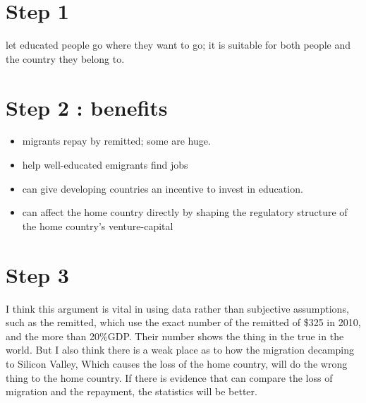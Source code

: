 \documentclass{thuemp}
\begin{document}






\maketitle




\wuhao 

\section*{Step 1}
let educated people go where they want to go; it is suitable for both people and the country they belong to.

\section*{Step 2 : benefits}
\begin{itemize}
  \item migrants repay by remitted; some are huge.
  \item help well-educated emigrants find jobs

  \item can give developing countries an incentive to invest in education.

  \item can affect the home country directly by shaping the regulatory structure of the home country's venture-capital
  

\end{itemize}

\section*{Step 3 }
I think this argument is vital in using data rather than subjective assumptions, such as the remitted, which use the exact number of the remitted of \$325 in 2010, and the more than 20\%GDP. Their number shows 
the thing in the true in the world. But I also think there is a weak place as to how the migration decamping to Silicon Valley, Which causes the 
loss of the home country, will do the wrong thing to the home country. If there is evidence that can compare the loss of migration and the repayment, the statistics will be better.
\end{document}

